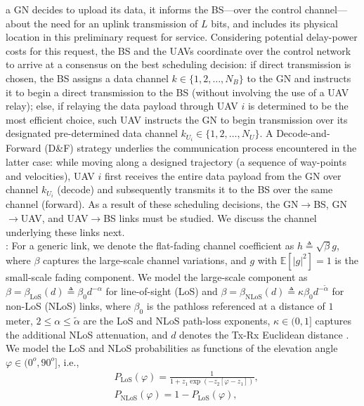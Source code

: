 \documentclass[10pt, twocolumn]{IEEEtran}
\theoremstyle{plain}
\theoremstyle{definition}
\theoremstyle{remark}
\begin{document}
 a GN decides to upload its data, it informs the BS---over the control channel---about the need for an uplink transmission of $L$ bits, and includes its physical location in this preliminary request for service. Considering potential delay-power costs for this request, the BS and the UAVs coordinate over the control network to arrive at a consensus on the best scheduling decision: if direct transmission is chosen, the BS assigns a data channel $k{\in}\{1,2,{\dots},N_{B}\}$ to the GN and instructs it to begin a direct transmission to the BS (without involving the use of a UAV relay); else, if relaying the data payload through UAV $i$ is determined to be the most efficient choice, such UAV instructs the GN to begin transmission over its designated pre-determined data channel $k_{U_{i}}{\in}\{1,2,{\dots},N_{U}\}$. A {Decode-and-Forward} (D\&F) strategy underlies the communication process encountered in the latter case: while moving along a designed trajectory (a sequence of way-points and velocities), UAV $i$ first receives the entire data payload from the GN over channel $k_{U_{i}}$ ({decode}) and subsequently transmits it to the BS over the same channel ({forward}). As a result of these scheduling decisions, the GN$\rightarrow$BS, GN$\rightarrow$UAV, and UAV$\rightarrow$BS links must be studied. We discuss the channel underlying these links next.\\
: For a generic link, we denote the flat-fading channel coefficient as $h{\triangleq}\sqrt{\beta}g$, where $\beta$ captures the large-scale channel variations, and $g$ with $\mathbb{E}\left[|g|^2\right]{=}1$ is the small-scale fading component. We model the large-scale component as $\beta{=}\beta_{\mathrm{LoS}}(d){\triangleq}\beta_{0}d^{-\alpha}$ for line-of-sight (LoS) and $\beta{=}\beta_{\mathrm{NLoS}}(d){\triangleq}\kappa\beta_{0}d^{-\tilde{\alpha}}$ for non-LoS (NLoS) links, where $\beta_{0}$ is the pathloss referenced at a distance of $1$ meter, $2{\leq}\alpha{\leq}\tilde{\alpha}$ are the LoS and NLoS path-loss exponents, $\kappa{\in}(0,1]$ captures the additional NLoS attenuation, and $d$ denotes the Tx-Rx Euclidean distance \cite{SCA}. We model the LoS and NLoS probabilities as functions of the elevation angle $\varphi{\in}(0^{o},90^{o}]$, i.e., 
\begin{align}\label{eq:PLoS}
	&P_{\mathrm{LoS}}(\varphi)=\frac{1}{1+z_{1}\exp\left(-z_{2}\left[\varphi-z_{1}\right]\right)},\\
	&P_{\mathrm{NLoS}}(\varphi)=1-P_{\mathrm{LoS}}(\varphi),
\end{align}
\end{document}
